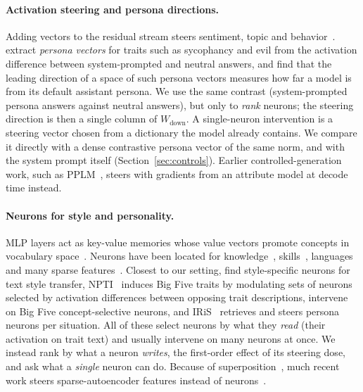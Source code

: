 \documentclass[11pt]{article}
\newcommand{\wdown}{W_{\text{down}}}
\begin{document}
\paragraph{Activation steering and persona directions.} Adding vectors to the residual stream steers sentiment, topic and behavior~\citep{subramani2022extracting,turner2023activation,rimsky2024steering,zou2023representation,li2023inference}. \citet{chen2025persona} extract \emph{persona vectors} for traits such as sycophancy and evil from the activation difference between system-prompted and neutral answers, and \citet{lu2026assistant} find that the leading direction of a space of such persona vectors measures how far a model is from its default assistant persona. We use the same contrast (system-prompted persona answers against neutral answers), but only to \emph{rank} neurons; the steering direction is then a single column of $\wdown$. A single-neuron intervention is a steering vector chosen from a dictionary the model already contains. We compare it directly with a dense contrastive persona vector of the same norm, and with the system prompt itself (Section~\ref{sec:controls}). Earlier controlled-generation work, such as PPLM~\citep{dathathri2020plug}, steers with gradients from an attribute model at decode time instead.

\paragraph{Neurons for style and personality.} MLP layers act as key-value memories whose value vectors promote concepts in vocabulary space~\citep{geva2021ffn,geva2022promoting}. Neurons have been located for knowledge~\citep{dai2022knowledge}, skills~\citep{wang2022skill}, languages~\citep{tang2024language} and many sparse features~\citep{gurnee2023haystack,gurnee2024universal}. Closest to our setting, \citet{lai2024style} find style-specific neurons for text style transfer, NPTI~\citep{deng2025npti} induces Big Five traits by modulating sets of neurons selected by activation differences between opposing trait descriptions, \citet{harada2026psych} intervene on Big Five concept-selective neurons, and IRiS~\citep{wei2026iris} retrieves and steers persona neurons per situation. All of these select neurons by what they \emph{read} (their activation on trait text) and usually intervene on many neurons at once. We instead rank by what a neuron \emph{writes}, the first-order effect of its steering dose, and ask what a \emph{single} neuron can do. Because of superposition~\citep{elhage2022superposition}, much recent work steers sparse-autoencoder features instead of neurons~\citep{bricken2023monosemanticity,cunningham2023sparse,templeton2024scaling}.
\end{document}
